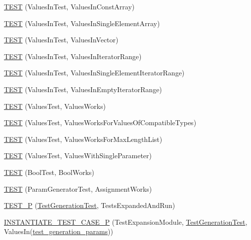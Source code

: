 \begin{DoxyCompactItemize}
\item 
\mbox{\hyperlink{googletest-param-test-test_8cc_aeeb7ce0b55e6d2cfc439149470c7af16}{T\+E\+ST}} (Values\+In\+Test, Values\+In\+Const\+Array)
\item 
\mbox{\hyperlink{googletest-param-test-test_8cc_ada74720d1b4b4c63cf08033f4509561b}{T\+E\+ST}} (Values\+In\+Test, Values\+In\+Single\+Element\+Array)
\item 
\mbox{\hyperlink{googletest-param-test-test_8cc_a562952744cd40b914d6547e83003c257}{T\+E\+ST}} (Values\+In\+Test, Values\+In\+Vector)
\item 
\mbox{\hyperlink{googletest-param-test-test_8cc_a231a43db61584a3f11662bdc78b6cc77}{T\+E\+ST}} (Values\+In\+Test, Values\+In\+Iterator\+Range)
\item 
\mbox{\hyperlink{googletest-param-test-test_8cc_a38f446e378a9ff60bd6a1df2d533a1df}{T\+E\+ST}} (Values\+In\+Test, Values\+In\+Single\+Element\+Iterator\+Range)
\item 
\mbox{\hyperlink{googletest-param-test-test_8cc_aed44e3d25084500088fb9cb99e189939}{T\+E\+ST}} (Values\+In\+Test, Values\+In\+Empty\+Iterator\+Range)
\item 
\mbox{\hyperlink{googletest-param-test-test_8cc_ad859819e6b2a7ec58c4fd509b5cfc26c}{T\+E\+ST}} (Values\+Test, Values\+Works)
\item 
\mbox{\hyperlink{googletest-param-test-test_8cc_a079a199d832d0c61689193e9c9a4fd1a}{T\+E\+ST}} (Values\+Test, Values\+Works\+For\+Values\+Of\+Compatible\+Types)
\item 
\mbox{\hyperlink{googletest-param-test-test_8cc_a5d96d28bb6fd22c56222a4b358a8c65e}{T\+E\+ST}} (Values\+Test, Values\+Works\+For\+Max\+Length\+List)
\item 
\mbox{\hyperlink{googletest-param-test-test_8cc_af5c833610dcfcdfed7bcaa5f2e7dcf16}{T\+E\+ST}} (Values\+Test, Values\+With\+Single\+Parameter)
\item 
\mbox{\hyperlink{googletest-param-test-test_8cc_a3f3ae54fc86fcf5881329fb7e8e4b8ee}{T\+E\+ST}} (Bool\+Test, Bool\+Works)
\item 
\mbox{\hyperlink{googletest-param-test-test_8cc_aca8e985a9ed651999aed02287e9e67ba}{T\+E\+ST}} (Param\+Generator\+Test, Assignment\+Works)
\item 
\mbox{\hyperlink{googletest-param-test-test_8cc_a6c5cf7b74d0cec5d5170659d1d31b560}{T\+E\+S\+T\+\_\+P}} (\mbox{\hyperlink{classTestGenerationTest}{Test\+Generation\+Test}}, Tests\+Expanded\+And\+Run)
\item 
\mbox{\hyperlink{googletest-param-test-test_8cc_ac76aec2b09390e1a1f8325a6ef2837fb}{I\+N\+S\+T\+A\+N\+T\+I\+A\+T\+E\+\_\+\+T\+E\+S\+T\+\_\+\+C\+A\+S\+E\+\_\+P}} (Test\+Expansion\+Module, \mbox{\hyperlink{classTestGenerationTest}{Test\+Generation\+Test}}, Values\+In(\mbox{\hyperlink{googletest-param-test-test_8cc_aefe5c7eafc17e71cec010d92628bf84f}{test\+\_\+generation\+\_\+params}}))

\end{DoxyCompactItemize}
